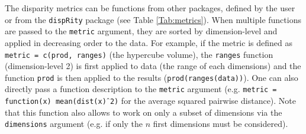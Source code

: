 \documentclass[12pt,letterpaper]{article}
\newcommand{\disp}{\texttt{dispRity} }
\begin{document}
The disparity metrics can be functions from other packages, defined by the user or from the \disp package (see Table \ref{Tab:metrics}).
When multiple functions are passed to the \texttt{metric} argument, they are sorted by dimension-level and applied in decreasing order to the data.
For example, if the metric is defined as \texttt{metric = c(prod, ranges)} (the hypercube volume), the \texttt{ranges} function (dimension-level 2) is first applied to data (the range of each dimensions) and the function \texttt{prod} is then applied to the results (\texttt{prod(ranges(data))}).
One can also directly pass a function description to the \texttt{metric} argument (e.g. \texttt{metric = function(x) mean(dist(x)$\hat{\mkern6mu}$2)} for the average squared pairwise distance).
Note that this function also allows to work on only a subset of dimensions via the \texttt{dimensions} argument (e.g. if only the $n$ first dimensions must be considered).
\end{document}
